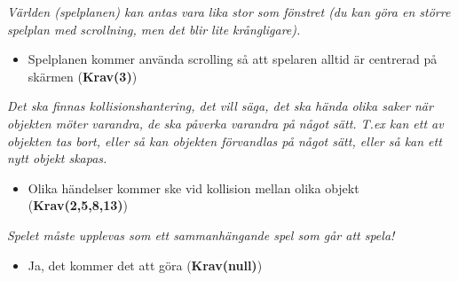 \documentclass{TDP003mall}
\begin{document}
\noindent\textit{Världen (spelplanen) kan antas vara lika stor som fönstret (du kan göra en större spelplan med scrollning,
men det blir lite krångligare).}
\begin{itemize}
\item Spelplanen kommer använda scrolling så att spelaren alltid är centrerad på skärmen (\textbf{Krav(3)})
\end{itemize}

\textit{Det ska finnas kollisionshantering, det vill säga, det ska hända olika saker när objekten möter varandra, 
de ska påverka varandra på något sätt. T.ex kan ett av objekten tas bort, eller så kan objekten förvandlas på
något sätt, eller så kan ett nytt objekt skapas.}
\begin{itemize}
\item Olika händelser kommer ske vid kollision mellan olika objekt (\textbf{Krav(2,5,8,13)})
\end{itemize}

\noindent\textit{Spelet måste upplevas som ett sammanhängande spel som går att spela!}
\begin{itemize}
\item Ja, det kommer det att göra (\textbf{Krav(null)})
\end{itemize}
\end{document}
